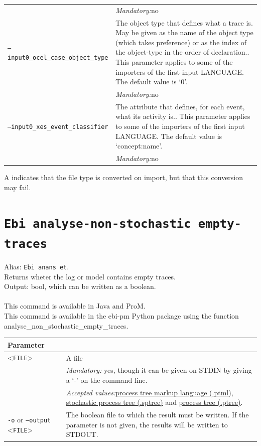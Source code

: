 {\begin{tabularx}{\linewidth}{lX}
&\textit{Mandatory:}\quad no\\
\texttt{--input0\_ocel\_case\_object\_type} & The object type that defines what a trace is. May be given as the name of the object type (which takes preference) or as the index of the object-type in the order of declaration.. This parameter applies to some of the importers of the first input LANGUAGE. The default value is `0'.\\
&\textit{Mandatory:}\quad no\\
\texttt{--input0\_xes\_event\_classifier} & The attribute that defines, for each event, what its activity is.. This parameter applies to some of the importers of the first input LANGUAGE. The default value is `concept:name'.\\
&\textit{Mandatory:}\quad no\\
\bottomrule
\end{tabularx}
A \textdagger{} indicates that the file type is converted on import, but that this conversion may fail.
\clearpage\section{\texttt{Ebi analyse-non-stochastic empty-traces}}
\label{command:Ebi analyse-non-stochastic empty-traces}
Alias: \texttt{Ebi anans et}.\\
Returns wheter the log or model contains empty traces.\\
\noindent Output: bool, which can be written as a boolean.\\
\\This command is available in Java and ProM.
\\This command is available in the ebi-pm Python package using the function analyse\_non\_stochastic\_empty\_traces.
\begin{tabularx}{\linewidth}{lX}
\toprule
Parameter \\\midrule
<\texttt{FILE}>&A file\\
&\textit{Mandatory:} \quad yes, though it can be given on STDIN by giving a `-' on the command line.\\
&\textit{Accepted values:}\quad \hyperref[filehandler:process tree markup language]{process tree markup language (.ptml)}, \hyperref[filehandler:stochastic process tree]{stochastic process tree (.sptree)} and \hyperref[filehandler:process tree]{process tree (.ptree)}.\\
\texttt{-o} or \texttt{--output} <\texttt{FILE}> &
The boolean file to which the result must be written. If the parameter is not given, the results will be written to STDOUT.\\

\end{tabularx}}
